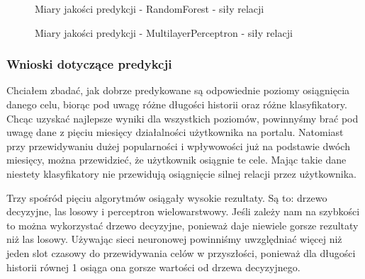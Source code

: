 \documentclass[polish,12pt]{aghthesis}
\begin{document}
\begin{enumerate}
    
        \begin{figure}[ht] 
    \centering
    \hfill%
    \caption{Miary jakości predykcji - RandomForest - siły relacji}
    \label{r:r4}
    \end{figure}
    \FloatBarrier
    

    
         \begin{figure}[ht] 
    \centering
    \hfill%
    \label{r:r5}
    \caption{Miary jakości predykcji - MultilayerPerceptron - siły relacji}
\end{figure}
\FloatBarrier

\end{enumerate}


\subsubsection{Wnioski dotyczące predykcji}

Chciałem zbadać, jak dobrze predykowane są odpowiednie poziomy osiągnięcia danego celu, biorąc pod uwagę różne długości historii oraz różne klasyfikatory. Chcąc uzyskać najlepsze wyniki dla wszystkich poziomów, powinnyśmy brać pod uwagę dane z pięciu miesięcy działalności użytkownika na portalu. Natomiast przy przewidywaniu dużej popularności i wpływowości już na podstawie dwóch miesięcy, można przewidzieć, że użytkownik osiągnie te cele. Mając takie dane niestety klasyfikatory nie przewidują osiągnięcie silnej relacji przez użytkownika.

Trzy spośród pięciu algorytmów osiągały wysokie rezultaty. Są to: drzewo decyzyjne, las losowy i perceptron wielowarstwowy. Jeśli zależy nam na szybkości to można wykorzystać drzewo decyzyjne, ponieważ daje niewiele gorsze rezultaty niż las losowy. Używając sieci neuronowej powinniśmy uwzględniać więcej niż jeden slot czasowy do przewidywania celów w przyszłości, ponieważ dla długości historii równej 1 osiąga ona gorsze wartości od drzewa decyzyjnego.
\end{document}
